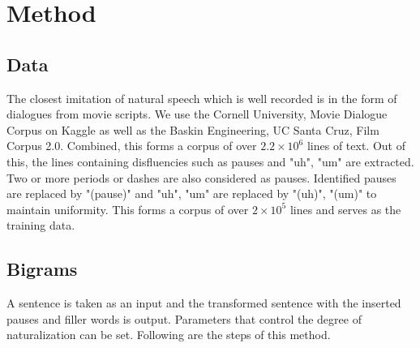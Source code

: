 \documentclass[journal]{IEEEtran}
\begin{document}
\section{Method}
\subsection{Data}
The closest imitation of natural speech which is well recorded is in the form of dialogues from movie scripts. We use the Cornell University, Movie Dialogue Corpus on Kaggle\cite{cornell} as well as the Baskin Engineering, UC Santa Cruz, Film Corpus 2.0.\cite{ucsc} Combined, this forms a corpus of over $2.2 \times 10^{6}$ lines of text. Out of this, the lines containing disfluencies such as pauses and "uh", "um" are extracted. Two or more periods or dashes are also considered as pauses. Identified pauses are replaced by "(pause)" and "uh", "um" are replaced by "(uh)", "(um)" to maintain uniformity. This forms a corpus of over $2 \times 10^{5}$ lines and serves as the training data.

\subsection{Bigrams}
A sentence is taken as an input and the transformed sentence with the inserted pauses and filler words is output. Parameters that control the degree of naturalization can be set. Following are the steps of this method.
\end{document}
